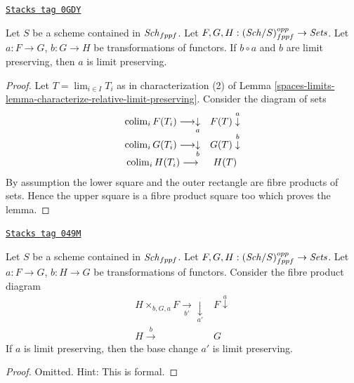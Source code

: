 \begin{lemma}
\label{spaces-limits-lemma-locally-finite-presentation-permanence}
\href{https://stacks.math.columbia.edu/tag/0GDY}{\texttt{Stacks tag 0GDY}}

Let $S$ be a scheme contained in $\mathit{Sch}_{fppf}$.
Let $F, G, H : (\mathit{Sch}/S)_{fppf}^{opp} \to \textit{Sets}$.
Let $a : F \to G$, $b : G \to H$ be transformations of functors.
If $b \circ a$ and $b$ are limit preserving, then $a$
is limit preserving.
\end{lemma}

\begin{proof}
Let $T = \lim_{i \in I} T_i$ as in characterization (2) of
Lemma \ref{spaces-limits-lemma-characterize-relative-limit-preserving}.
Consider the diagram of sets
$$
\begin{array}{cc}\operatorname{colim}_i F(T_i) \longrightarrow\underset{a}{\downarrow} & F(T) \overset{a}{\downarrow} \\ \operatorname{colim}_i G(T_i) \longrightarrow\underset{b}{\downarrow} & G(T) \overset{b}{\downarrow} \\ \operatorname{colim}_i H(T_i) \longrightarrow & H(T)\end{array}
$$
By assumption the lower square and the outer rectangle
are fibre products of sets. Hence the upper square
is a fibre product square too which proves the lemma.
\end{proof}

\begin{lemma}
\label{spaces-limits-lemma-base-change-locally-finite-presentation}
\href{https://stacks.math.columbia.edu/tag/049M}{\texttt{Stacks tag 049M}}

Let $S$ be a scheme contained in $\mathit{Sch}_{fppf}$.
Let $F, G, H : (\mathit{Sch}/S)_{fppf}^{opp} \to \textit{Sets}$.
Let $a : F \to G$, $b : H \to G$ be transformations of functors.
Consider the fibre product diagram
$$
\begin{array}{cc}H \times_{b, G, a} F \underset{b'}{\longrightarrow}\underset{a'}{\downarrow} & F \overset{a}{\downarrow} \\ H \overset{b}{\longrightarrow} & G\end{array}
$$
If $a$ is limit preserving, then the base change $a'$ is limit preserving.
\end{lemma}

\begin{proof}
Omitted. Hint: This is formal.
\end{proof}

